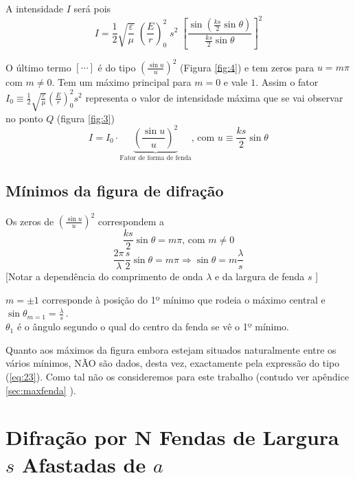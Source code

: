 \documentclass[a4paper,12pt]{article}
\begin{document}
A intensidade $I$ será pois
\begin{equation}
	\label{eq:31} I = \frac{1}{2}\sqrt{\frac{ \varepsilon}{\mu}} \; \left( \frac{E}{r} \right)_0^2 \; s^2 \; \left[ \frac{ \sin( \frac{k s}{2}\sin \theta)}{ \frac{k s}{2}\sin \theta} \right]^2 
\end{equation}

O último termo $\left[ \cdots \right] $  é do tipo $(\frac{\sin u}{u})^2 $ (Figura \ref{fig:4}) e tem zeros para $u = m \pi$ com $m \neq 0$. Tem um máximo principal para $m = 0$ e vale $1$. Assim o fator $I_0 \equiv \frac{1}{2} \sqrt{\frac{ \varepsilon}{\mu}} (\frac{E}{r })_0^2 s^2$ representa o valor de intensidade máxima que se vai observar no ponto $Q$ (figura \ref{fig:3})
\begin{equation}
	\label{eq:32} I = I_0 \cdot \underbrace{\left( \frac{\sin u}{u} \right)^2}_\text{Fator de forma de fenda} \text{, com } u\equiv \frac{k s}{2}\sin \theta 
\end{equation}

\subsection{ \sf Mínimos da figura de difração}
Os zeros de $(\frac{\sin u}{u})^2 $ correspondem a 
\begin{equation}
	\label{eq:33} \frac{k s}{2}\sin \theta = m \pi \text{, com } m \ne 0 
\end{equation}
\begin{equation}
	\label{eq:34} \frac{2 \pi}{\lambda} \frac{ s}{2} \sin \theta = m \pi \Rightarrow \sin \theta = m \frac{\lambda}{s} 
\end{equation}
[Notar a dependência do comprimento de onda  $\lambda$ e da largura de fenda $s$ ]

$m= \pm 1 $ corresponde à posição do 1º mínimo que rodeia o máximo central e $\sin \theta_{m=1} = \frac{\lambda}{s}$\,.\\
 $\theta_1$ é o ângulo segundo o qual do centro da fenda se vê o 1º mínimo.

 Quanto  aos máximos da figura embora estejam situados naturalmente entre os vários mínimos, NÃO são dados, desta vez,  exactamente pela expressão do tipo (\ref{eq:23}). Como tal não os consideremos para este trabalho 
 (contudo ver apêndice \ref{sec:maxfenda} ).

\section{\sf Difração por N Fendas de Largura \underline{$s$} \mbox{Afastadas} de \underline{$a$}}
\end{document}
